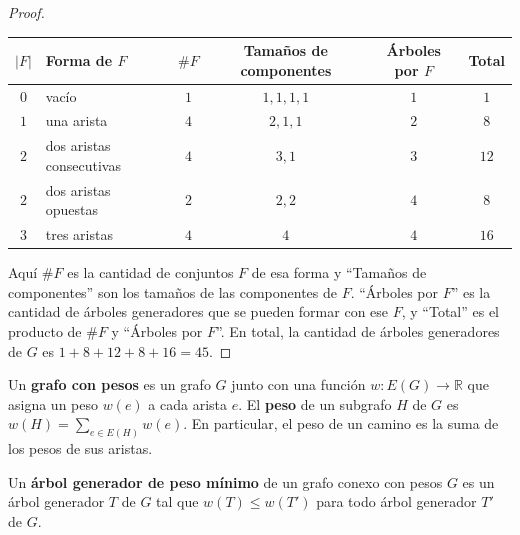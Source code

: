 \begin{proof}
    \begin{center}
        \small
        \setlength{\tabcolsep}{4pt}
        \begin{tabular}{clcccc}
            \toprule
            \( |F| \) & Forma de \( F \)         & \( \#F \) & Tamaños de componentes & Árboles por \( F \) & Total    \\
            \midrule
            \( 0 \)   & vacío                    & \( 1 \)   & \( 1,1,1,1 \)          & \( 1 \)             & \( 1 \)  \\
            \( 1 \)   & una arista               & \( 4 \)   & \( 2,1,1 \)            & \( 2 \)             & \( 8 \)  \\
            \( 2 \)   & dos aristas consecutivas & \( 4 \)   & \( 3,1 \)              & \( 3 \)             & \( 12 \) \\
            \( 2 \)   & dos aristas opuestas     & \( 2 \)   & \( 2,2 \)              & \( 4 \)             & \( 8 \)  \\
            \( 3 \)   & tres aristas             & \( 4 \)   & \( 4 \)                & \( 4 \)             & \( 16 \) \\
            \bottomrule
        \end{tabular}
    \end{center}
    Aquí \( \#F \) es la cantidad de conjuntos \( F \) de esa forma y ``Tamaños de componentes'' son los tamaños de las componentes de \( F \). ``Árboles por \( F \)'' es la cantidad de árboles generadores que se pueden formar con ese \( F \), y ``Total'' es el producto de \( \#F \) y ``Árboles por \( F \)''.
    En total, la cantidad de árboles generadores de \( G \) es \(
    1 + 8 + 12 + 8 + 16 = 45 \).
\end{proof}

\vspace{0.5cm}

\begin{definition}
    Un \textbf{grafo con pesos} es un grafo \( G \) junto con una función \( w : E(G) \to \mathbb{R} \) que asigna un peso \( w(e) \) a cada arista \( e \). El \textbf{peso} de un subgrafo \( H \) de \( G \) es \( w(H) = \sum_{e \in E(H)} w(e) \). En particular, el peso de un camino es la suma de los pesos de sus aristas.
\end{definition}

\begin{definition}
    Un \textbf{árbol generador de peso mínimo} de un grafo conexo con pesos \( G \) es un árbol generador \( T \) de \( G \) tal que \( w(T) \leq w(T') \) para todo árbol generador \( T' \) de \( G \).
\end{definition}

